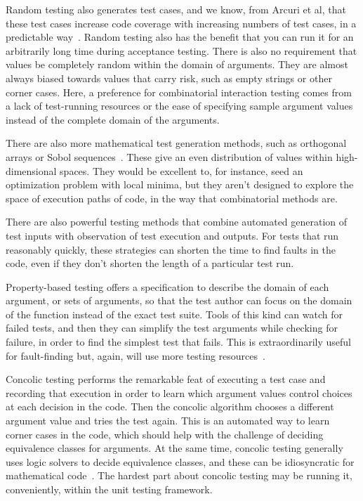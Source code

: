 \documentclass{juliacon}
\begin{document}
\vskip 6pt
Random testing also generates test cases, and we know, from Arcuri et al, that these test cases increase code coverage with increasing numbers of test cases, in a predictable way~\cite{Arcuri2012-az}. Random testing also has the benefit that you can run it for an arbitrarily long time during acceptance testing. There is also no requirement that values be completely random within the domain of arguments. They are almost always biased towards values that carry risk, such as empty strings or other corner cases. Here, a preference for combinatorial interaction testing comes from a lack of test-running resources or the ease of specifying sample argument values instead of the complete domain of the arguments.

\vskip 6pt
There are also more mathematical test generation methods, such as orthogonal arrays or Sobol sequences~\cite{He2013-th}. These give an even distribution of values within high-dimensional spaces. They would be excellent to, for instance, seed an optimization problem with local minima, but they aren't designed to explore the space of execution paths of code, in the way that combinatorial methods are.

\vskip 6pt
There are also powerful testing methods that combine automated generation of test inputs with observation of test execution and outputs. For tests that run reasonably quickly, these strategies can shorten the time to find faults in the code, even if they don't shorten the length of a particular test run.

\vskip 6pt
Property-based testing offers a specification to describe the domain of each argument, or sets of arguments, so that the test author can focus on the domain of the function instead of the exact test suite. Tools of this kind can watch for failed tests, and then they can simplify the test arguments while checking for failure, in order to find the simplest test that fails. This is extraordinarily useful for fault-finding but, again, will use more testing resources~\cite{loscher2018automating}.

\vskip 6pt
Concolic testing performs the remarkable feat of executing a test case and recording that execution in order to learn which argument values control choices at each decision in the code. Then the concolic algorithm chooses a different argument value and tries the test again. This is an automated way to learn corner cases in the code, which should help with the challenge of deciding equivalence classes for arguments. At the same time, concolic testing generally uses logic solvers to decide equivalence classes, and these can be idiosyncratic for mathematical code~\cite{King1976-jt,Wang2018-xh}. The hardest part about concolic testing may be running it, conveniently, within the unit testing framework.
\end{document}
